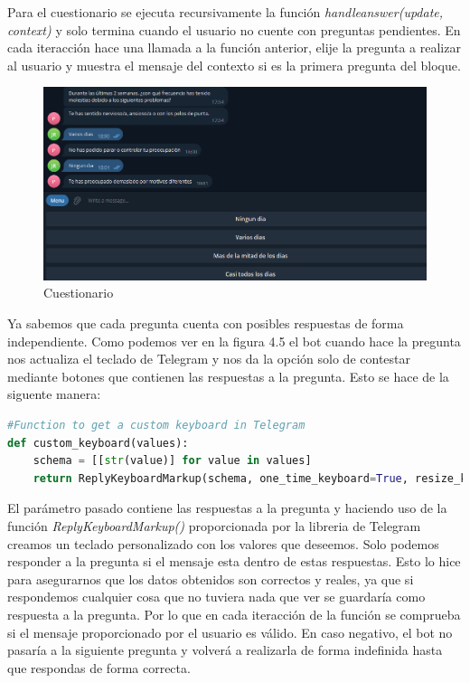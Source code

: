 Para el cuestionario se ejecuta recursivamente la función \textit{handleanswer(update, context)} y solo termina cuando el usuario no cuente con preguntas pendientes. En cada iteracción hace una llamada a la función anterior, elije la pregunta a realizar al usuario y muestra el mensaje del contexto si es la primera pregunta del bloque. \vspace{0.3cm}

\begin{figure}[!ht]
    \centering
    \includegraphics[width=1\textwidth]{imagenes/question.png}
    \caption{ Cuestionario }
    \label{fig:enter-label}
\end{figure}\vspace{0.3cm}

Ya sabemos que cada pregunta cuenta con posibles respuestas de forma independiente. Como podemos ver en la figura 4.5 el bot cuando hace la pregunta nos actualiza el teclado de Telegram y nos da la opción solo de contestar mediante botones que contienen las respuestas a la pregunta. Esto se hace de la siguente manera:

\begin{lstlisting}[language=Python]
#Function to get a custom keyboard in Telegram
def custom_keyboard(values):
    schema = [[str(value)] for value in values]
    return ReplyKeyboardMarkup(schema, one_time_keyboard=True, resize_keyboard=True)
\end{lstlisting}

El parámetro pasado contiene las respuestas a la pregunta y haciendo uso de la función \textit{ReplyKeyboardMarkup()} proporcionada por la libreria de Telegram creamos un teclado personalizado con los valores que deseemos. Solo podemos responder a la pregunta si el mensaje esta dentro de estas respuestas. Esto lo hice para asegurarnos que los datos obtenidos son correctos y reales, ya que si respondemos cualquier cosa que no tuviera nada que ver se guardaría como respuesta a la pregunta. Por lo que en cada iteracción de la función se comprueba si el mensaje proporcionado por el usuario es válido. En caso negativo, el bot no pasaría a la siguiente pregunta y volverá a realizarla de forma indefinida hasta que respondas de forma correcta. \vspace{0.3cm}

